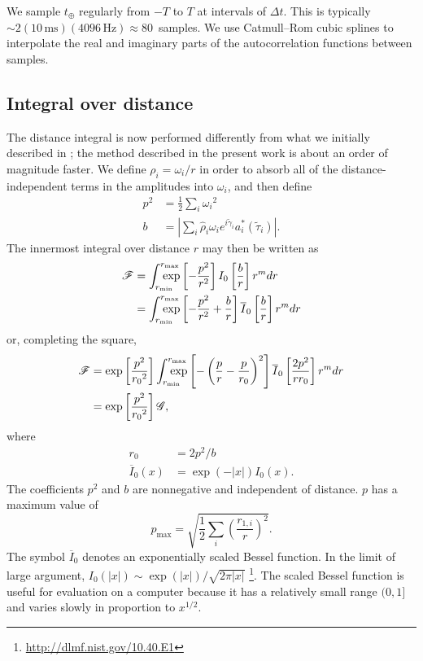 \documentclass[amsmath,amssymb,aps,prx,reprint,nopreprintnumbers,nofootinbib,showpacs]{revtex4-1}
\def\mathrlap{\mathpalette\mathrlapinternal}
\def\mathrlapinternal#1#2{\rlap{$\mathsurround=0pt#1{#2}$}}
\begin{document}
We sample $t_\oplus$ regularly from $-T$ to $T$ at intervals of $\Delta t$. This is typically $\sim 2 (10\,\mathrm{ms})(4096\,\mathrm{Hz}) \approx 80$~samples. We use Catmull\nobreakdashes--Rom cubic splines to interpolate the real and imaginary parts of the autocorrelation functions between samples.

\subsection{Integral over distance}
\label{sec:distance}

The distance integral is now performed differently from what we initially described in \cite{leo-singer-thesis,BerryLocalization}; the method described in the present work is about an order of magnitude faster. We define $\rho_i = \omega_i / r$ in order to absorb all of the distance-independent terms in the amplitudes into $\omega_i$, and then define
%
\begin{align}
    p^2 &= \frac{1}{2} \sum_i {\omega_i}^2 \label{eq:likelihood-p-factor} \\
    b &= \left| \sum_i \hat\rho_i \omega_i e^{i \tilde{\gamma}_i}
        a_i^*(\tilde{\tau}_i) \right|. \label{eq:likelihood-b-factor} \end{align}
%
The innermost integral over distance $r$ may then be written as
%
\begin{align}\label{eq:distance-integral}
    \mathscr{F} &=
        \int_{\mathrlap{r_\mathrm{min}}}^{\mathrlap{r_\mathrm{max}}}
        \exp\left[-\frac{p^2}{r^2}\right]
        I_0\left[\frac{b}{r}\right] r^m dr \nonumber \\
    &=
        \int_{\mathrlap{r_\mathrm{min}}}^{\mathrlap{r_\mathrm{max}}}
        \exp\left[-\frac{p^2}{r^2}+\frac{b}{r}\right]
        \overline{I}_0\left[\frac{b}{r}\right] r^m dr
\end{align}
%
or, completing the square,
%
\begin{align}
    \mathscr{F} &= \exp\left[\frac{p^2}{{r_0}^2}\right]
        \int_{\mathrlap{r_\mathrm{min}}}^{\mathrlap{r_\mathrm{max}}}
        \exp\left[-\left(\frac{p}{r} - \frac{p}{r_0}\right)^2\right]
        \overline{I}_0\left[\frac{2p^2}{r r_0}\right] r^m dr \\
    &= \exp\left[\frac{p^2}{{r_0}^2}\right] \mathscr{G},
\end{align}
%
where
%
\begin{align}
    r_0 &= 2 p^2 / b \\
    \overline{I}_0(x) &= \exp(-|x|) I_0(x).
\end{align}
%
The coefficients $p^2$ and $b$ are nonnegative and independent of distance. $p$ has a maximum value of
%
\begin{equation}
    p_\mathrm{max} = \sqrt{\frac{1}{2} \sum_i \left(\frac{r_{1,i}}{r}\right)^2}.
\end{equation}
%
The symbol $\overline{I}_0$ denotes an exponentially scaled Bessel function. In the limit of large argument, $I_0(|x|) \sim \exp(|x|) / \sqrt{2 \pi |x|}$ \citep{Olver:2010:NHMF,NIST:DLMF}\footnote{\url{http://dlmf.nist.gov/10.40.E1}}. The scaled Bessel function is useful for evaluation on a computer because it has a relatively small range $(0, 1]$ and varies slowly in proportion to $x^{1/2}$.
\end{document}
